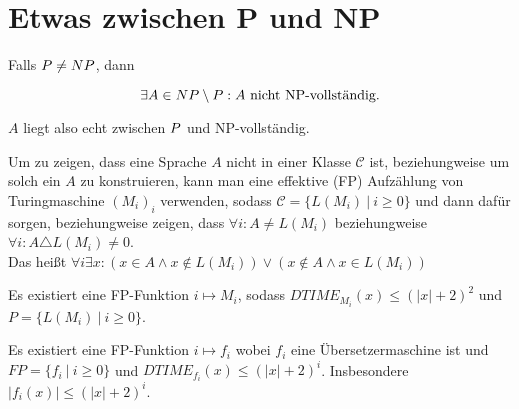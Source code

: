 

\section{Etwas zwischen P und NP}



\begin{satz}
    

    Falls $P \neq NP$, dann

    $$ \exists A \in NP \setminus P: A \text{ nicht NP-vollständig.} $$

    $A$ liegt also echt zwischen $P$ und NP-vollständig.

    
\end{satz}



\begin{definition}

    
    Um zu zeigen, dass eine Sprache $A$ nicht in einer Klasse $\mathcal{C}$ ist, beziehungweise um solch ein $A$ zu konstruieren, kann man eine effektive (FP) Aufzählung von Turingmaschine $(M_i)_i$ verwenden, sodass $\mathcal{C} = \{ L(M_i)\ |\ i \geq 0 \}$  und dann dafür sorgen, beziehungweise zeigen, dass $\forall i: A \neq L(M_i)$ beziehungweise $\forall i: A \triangle L(M_i) \neq 0$.\\
    Das heißt $\forall i \exists x: \left(x \in A \land x \notin L(M_i) \right) \lor \left( x \notin A \land x \in L(M_i) \right)$

\end{definition}


\begin{lemma}
    
    Es existiert eine FP-Funktion $i \mapsto M_i$, sodass $DTIME_{M_i}(x) \leq (|x| + 2)^2$ und $P = \{ L(M_i)\ |\ i \geq 0 \}$.

\end{lemma}

\begin{lemma}
    
    Es existiert eine FP-Funktion $i \mapsto f_i$ wobei $f_i$ eine Übersetzermaschine ist und $FP = \{ f_i\ |\ i \geq 0 \}$ und $DTIME_{f_i}(x) \leq (|x| + 2)^i$. Insbesondere $|f_i(x)| \leq (|x| + 2)^i$.

\end{lemma}

